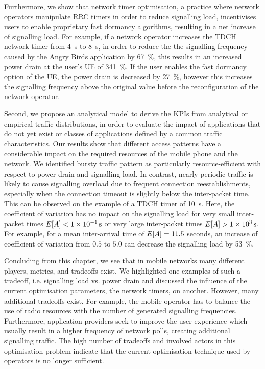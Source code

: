 Furthermore, we show that network timer optimisation, a practice where network operators manipulate \gls{RRC} timers in order to reduce signalling load, incentivises users to enable proprietary fast dormancy algorithms, resulting in a net increase of signalling load.
For example, if a network operator increases the \gls{TDCH} network timer from \SI{4}{\second} to \SI{8}{\second}, in order to reduce the the signalling frequency caused by the Angry Birds application by \SI{67}{\percent}, this results in an increased power drain at the user's \gls{UE} of \SI{341}{\percent}.
If the user enables the fast dormancy option of the \gls{UE}, the power drain is decreased by \SI{27}{\percent}, however this increases the signalling frequency above the original value before the reconfiguration of the network operator.

Second, we propose an analytical model to derive the \glspl{KPI} from analytical or empirical traffic distributions, in order to evaluate the impact of applications that do not yet exist or classes of applications defined by a common traffic characteristics.
Our results show that different access patterns have a considerable impact on the required resources of the mobile phone and the network.
We identified bursty traffic pattern as particularly resource-efficient with respect to power drain and signalling load.
In contrast, nearly periodic traffic is likely to cause signalling overload due to frequent connection reestablishments, especially when the connection timeout is slightly below the inter-packet time.
This can be observed on the example of a \gls{TDCH} timer of \SI{10}{\second}.
Here, the coefficient of variation has no impact on the signalling load for very small inter-packet times \(E[A]<\SI{1e-1}{\second}\) or very large inter-packet times \(E[A]>\SI{1e3}{\second}\).
For example, for a mean inter-arrival time of \(E[A] = 11.5\) seconds, an increase of coefficient of variation from \(0.5\) to \(5.0\) can decrease the signalling load by \SI{53}{\percent}.

Concluding from this chapter, we see that in mobile networks many different players, metrics, and tradeoffs exist.
We highlighted one examples of such a tradeoff, i.e. signalling load vs. power drain and discussed the influence of the current optimisation parameters, the network timers, on another.
However, many additional tradeoffs exist.
For example, the mobile operator has to balance the use of radio resources with the number of generated signalling frequencies.
Furthermore, application providers seek to improve the user experience which usually result in a higher frequency of network polls, creating additional signalling traffic.
The high number of tradeoffs and involved actors in this optimisation problem indicate that the current optimisation technique used by operators is no longer sufficient.

